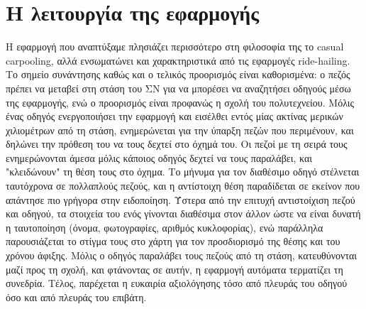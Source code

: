 \documentclass[../thesis.tex]{subfiles}
\begin{document}
\section{Η λειτουργία της εφαρμογής}

Η εφαρμογή που αναπτύξαμε πλησιάζει περισσότερο στη φιλοσοφία της το casual carpooling, αλλά ενσωματώνει και χαρακτηριστικά από τις εφαρμογές ride-hailing.
Το σημείο συνάντησης καθώς και ο τελικός προορισμός είναι καθορισμένα: ο πεζός πρέπει να μεταβεί στη στάση του ΣΝ για να μπορέσει να αναζητήσει οδηγούς μέσω της εφαρμογής, ενώ ο προορισμός είναι προφανώς η σχολή του πολυτεχνείου.
Μόλις ένας οδηγός ενεργοποιήσει την εφαρμογή και εισέλθει εντός μίας ακτίνας μερικών χιλιομέτρων από τη στάση, ενημερώνεται για την ύπαρξη πεζών που περιμένουν, και δηλώνει την πρόθεση του να τους δεχτεί στο όχημά του.
Οι πεζοί με τη σειρά τους ενημερώνονται άμεσα μόλις κάποιος οδηγός δεχτεί να τους παραλάβει, και "κλειδώνουν" τη θέση τους στο όχημα.
Το μήνυμα για τον διαθέσιμο οδηγό στέλνεται ταυτόχρονα σε πολλαπλούς πεζούς, και η αντίστοιχη θέση παραδίδεται σε εκείνον που απάντησε πιο γρήγορα στην ειδοποίηση.
Ύστερα από την επιτυχή αντιστοίχιση πεζού και οδηγού, τα στοιχεία του ενός γίνονται διαθέσιμα στον άλλον ώστε να είναι δυνατή η ταυτοποίηση (όνομα, φωτογραφίες, αριθμός κυκλοφορίας), ενώ παράλληλα παρουσιάζεται το στίγμα τους στο χάρτη για τον προσδιορισμό της θέσης και του χρόνου άφιξης.
Μόλις ο οδηγός παραλάβει τους πεζούς από τη στάση, κατευθύνονται μαζί προς τη σχολή, και φτάνοντας σε αυτήν, η εφαρμογή αυτόματα τερματίζει τη συνεδρία.
Τέλος, παρέχεται η ευκαιρία αξιολόγησης τόσο από πλευράς του οδηγού όσο και από πλευράς του επιβάτη.
\end{document}

